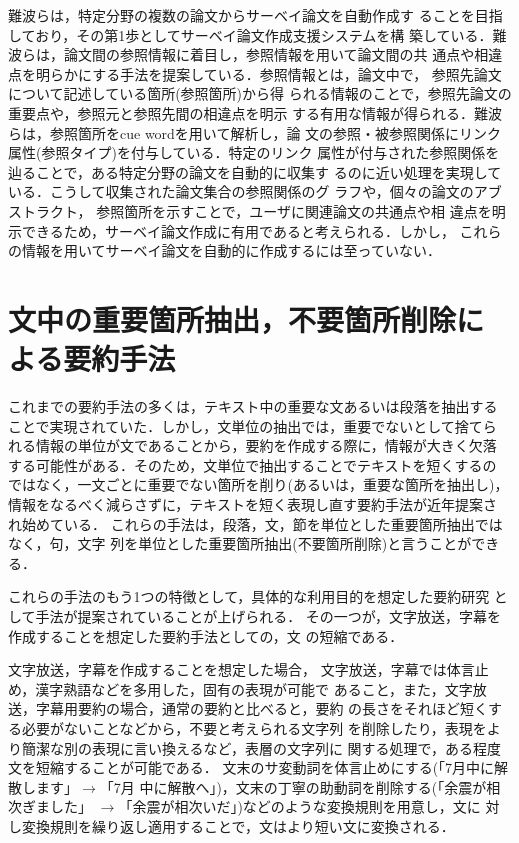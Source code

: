 難波らは，特定分野の複数の論文からサーベイ論文を自動作成す
ることを目指しており，その第1歩としてサーベイ論文作成支援システムを構
築している．難波らは，論文間の参照情報に着目し，参照情報を用いて論文間の共
通点や相違点を明らかにする手法を提案している．参照情報とは，論文中で，
参照先論文について記述している箇所(参照箇所)から得
られる情報のことで，参照先論文の重要点や，参照元と参照先間の相違点を明示
する有用な情報が得られる．難波らは，参照箇所をcue wordを用いて解析し，論
文の参照・被参照関係にリンク属性(参照タイプ)を付与している．特定のリンク
属性が付与された参照関係を辿ることで，ある特定分野の論文を自動的に収集す
るのに近い処理を実現している．こうして収集された論文集合の参照関係のグ
ラフや，個々の論文のアブストラクト， 
参照箇所を示すことで，ユーザに関連論文の共通点や相
違点を明示できるため，サーベイ論文作成に有用であると考えられる．しかし，
これらの情報を用いてサーベイ論文を自動的に作成するには至っていない．

\section{文中の重要箇所抽出，不要箇所削除による要約手法}

これまでの要約手法の多くは，テキスト中の重要な文あるいは段落を抽出する
ことで実現されていた．しかし，文単位の抽出では，重要でないとして捨てら
れる情報の単位が文であることから，要約を作成する際に，情報が大きく欠落
する可能性がある．そのため，文単位で抽出することでテキストを短くするの
ではなく，一文ごとに重要でない箇所を削り(あるいは，重要な箇所を抽出し)，
情報をなるべく減らさずに，テキストを短く表現し直す要約手法が近年提案さ
れ始めている．
これらの手法は，段落，文，節を単位とした重要箇所抽出ではなく，句，文字
列を単位とした重要箇所抽出(不要箇所削除)と言うことができる．

これらの手法のもう1つの特徴として，具体的な利用目的を想定した要約研究
として手法が提案されていることが上げられる．
その一つが，文字放送，字幕を作成することを想定した要約手法としての，文
の短縮である．

文字放送，字幕を作成することを想定した場合，
文字放送，字幕では体言止め，漢字熟語などを多用した，固有の表現が可能で
あること，また，文字放送，字幕用要約の場合，通常の要約と比べると，要約
の長さをそれほど短くする必要がないことなどから，不要と考えられる文字列
を削除したり，表現をより簡潔な別の表現に言い換えるなど，表層の文字列に
関する処理で，ある程度文を短縮することが可能である．
文末のサ変動詞を体言止めにする(「7月中に解散します」$\rightarrow$「7月
中に解散へ」)，文末の丁寧の助動詞を削除する(「余震が相次ぎました」
$\rightarrow$「余震が相次いだ」)などのような変換規則を用意し，文に
対し変換規則を繰り返し適用することで，文はより短い文に変換される．

